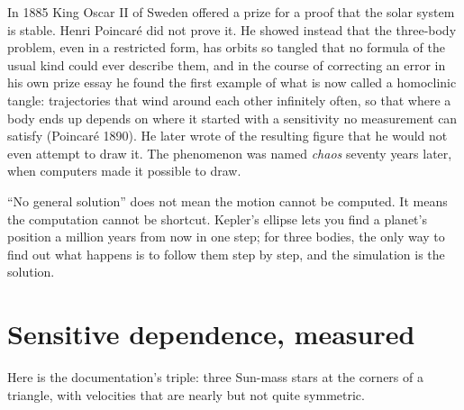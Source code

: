 \documentclass[
  10.5pt,
  letterpaper,
]{scrbook}
\theoremstyle{plain}
\theoremstyle{remark}
\begin{document}
\begin{tcolorbox}[enhanced jigsaw, arc=.35mm, bottomrule=.15mm, bottomtitle=1mm, breakable, colback=white, colbacktitle=quarto-callout-note-color!10!white, colframe=quarto-callout-note-color-frame, coltitle=black, left=2mm, leftrule=.75mm, opacityback=0, opacitybacktitle=0.6, rightrule=.15mm, title={Where it comes from}, titlerule=0mm, toprule=.15mm, toptitle=1mm]

In 1885 King Oscar II of Sweden offered a prize for a proof that the
solar system is stable. Henri Poincaré did not prove it. He showed
instead that the three-body problem, even in a restricted form, has
orbits so tangled that no formula of the usual kind could ever describe
them, and in the course of correcting an error in his own prize essay he
found the first example of what is now called a homoclinic tangle:
trajectories that wind around each other infinitely often, so that where
a body ends up depends on where it started with a sensitivity no
measurement can satisfy (Poincaré 1890). He later wrote of the resulting
figure that he would not even attempt to draw it. The phenomenon was
named \emph{chaos} seventy years later, when computers made it possible
to draw.

``No general solution'' does not mean the motion cannot be computed. It
means the computation cannot be shortcut. Kepler's ellipse lets you find
a planet's position a million years from now in one step; for three
bodies, the only way to find out what happens is to follow them step by
step, and the simulation is the solution.

\end{tcolorbox}

\section{Sensitive dependence,
measured}\label{sensitive-dependence-measured}

Here is the documentation's triple: three Sun-mass stars at the corners
of a triangle, with velocities that are nearly but not quite symmetric.
\end{document}

